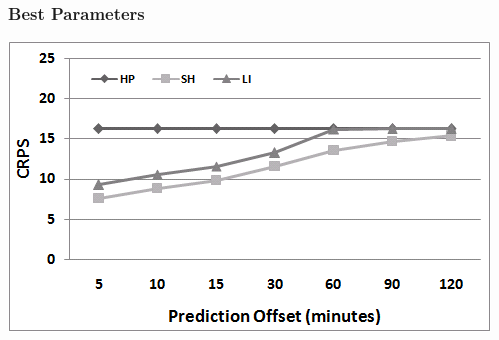 \documentclass[t]{beamer}
\begin{document}
\begin{frame}\frametitle{Best Parameters}
\begin{center}
	\includegraphics[scale=0.5]{Links_Best.png}
\end{center}
\end{frame}
\end{document}
